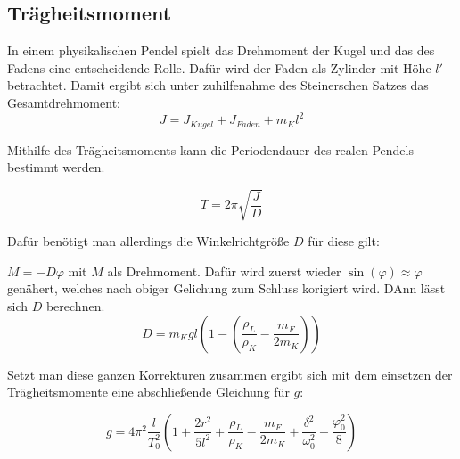 \subsection{Trägheitsmoment}

In einem physikalischen Pendel spielt das Drehmoment der Kugel und das des Fadens eine entscheidende Rolle.
Dafür wird der Faden als Zylinder mit Höhe $l'$ betrachtet. Damit ergibt sich unter zuhilfenahme des Steinerschen Satzes das Gesamtdrehmoment:
\begin{equation}
    J = J_{Kugel} + J_ {Faden} + m_K l^2
\end{equation}

Mithilfe des Trägheitsmoments kann die Periodendauer des realen Pendels bestimmt werden.

\begin{equation}
    T = 2 \pi \sqrt{\frac{J}{D}}
\end{equation}

Dafür benötigt man allerdings die Winkelrichtgröße $D$ für diese gilt:

$M = -D \varphi$
mit $M$ als Drehmoment.
Dafür wird zuerst wieder $\sin(\varphi) \approx \varphi$ genähert, welches nach obiger Gelichung zum Schluss korigiert wird.
DAnn lässt sich $D$ berechnen.
\begin{equation}
    D = m_K g l \left( 1 - \left(\frac{\rho_L}{\rho_K}- \frac{m_F}{2 m_K}\right)\right)
\end{equation}

Setzt man diese ganzen Korrekturen zusammen ergibt sich mit dem einsetzen der Trägheitsmomente eine abschließende Gleichung für $g$:

\begin{equation}
    g = 4 \pi^2 \frac{l}{T_0^2}\left(1 + \frac{2 r^2}{5l^2}+  \frac{\rho_L}{\rho_K}- \frac{m_F}{2 m_K} + \frac{\delta^2}{\omega_0 ^2} +\frac{\varphi_0^2}{8}\right)
    \label{eq:leckmich}
\end{equation}